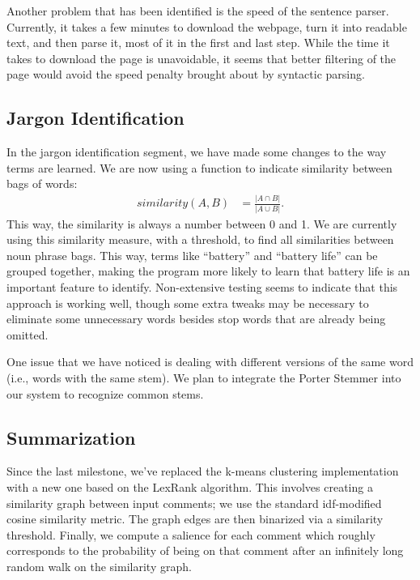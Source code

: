 \documentclass{article}
\begin{document}
Another problem that has been identified is the speed of the sentence parser.
Currently, it takes a few minutes to download the webpage, turn it into readable
text, and then parse it, most of it in the first and last step. While the time
it takes to download the page is unavoidable, it seems that better filtering of
the page would avoid the speed penalty brought about by syntactic parsing.

\subsection{Jargon Identification} %

In the jargon identification segment, we have made some changes to the way terms are learned.  We are now using a function to indicate similarity between bags of words:\begin{align*}
	similarity(A, B) &= \frac{|A\cap B|}{|A\cup B|}.
\end{align*}This way, the similarity is always a number between 0 and 1.  We are currently using this similarity measure, with a threshold, to find all similarities between noun phrase bags.  This way, terms like ``battery'' and ``battery life'' can be grouped together, making the program more likely to learn that battery life is an important feature to identify.  Non-extensive testing seems to indicate that this approach is working well, though some extra tweaks may be necessary to eliminate some unnecessary words besides stop words that are already being omitted.

One issue that we have noticed is dealing with different versions of the same word (i.e., words with the same stem).  We plan to integrate the Porter Stemmer \cite{porter} into our system to recognize common stems.


\subsection{Summarization} %

Since the last milestone, we've replaced the k-means clustering
implementation with a new one based on the LexRank algorithm.
This involves creating a similarity graph between input comments;
we use the standard idf-modified cosine similarity metric. The
graph edges are then binarized via a similarity threshold. Finally,
we compute a salience for each comment which roughly corresponds
to the probability of being on that comment after an infinitely
long random walk on the similarity graph.
\end{document}
